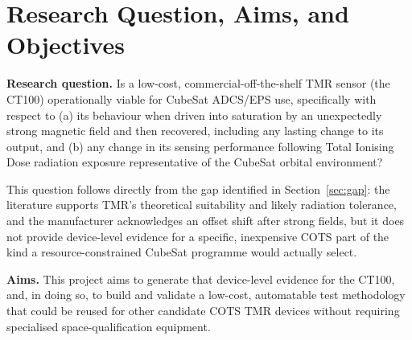 \documentclass[12pt,a4paper]{article}
\begin{document}
\section{Research Question, Aims, and Objectives}
\label{sec:research-question}

\textbf{Research question.} Is a low-cost, commercial-off-the-shelf TMR sensor (the CT100) operationally viable for CubeSat ADCS/EPS use, specifically with respect to (a) its behaviour when driven into saturation by an unexpectedly strong magnetic field and then recovered, including any lasting change to its output, and (b) any change in its sensing performance following Total Ionising Dose radiation exposure representative of the CubeSat orbital environment?

This question follows directly from the gap identified in Section~\ref{sec:gap}: the literature supports TMR's theoretical suitability and likely radiation tolerance, and the manufacturer acknowledges an offset shift after strong fields, but it does not provide device-level evidence for a specific, inexpensive COTS part of the kind a resource-constrained CubeSat programme would actually select.

\textbf{Aims.} This project aims to generate that device-level evidence for the CT100, and, in doing so, to build and validate a low-cost, automatable test methodology that could be reused for other candidate COTS TMR devices without requiring specialised space-qualification equipment.
\end{document}
